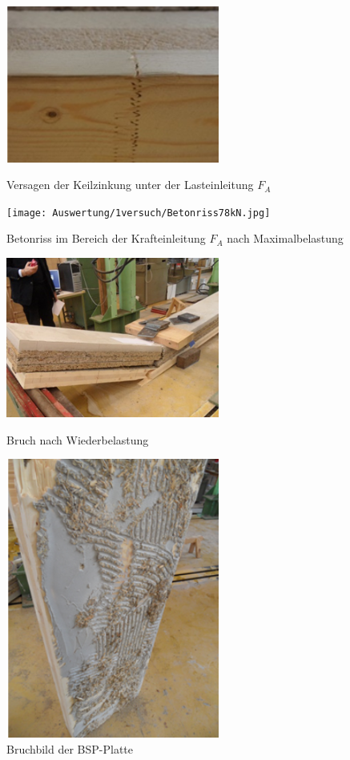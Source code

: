\begin{figure}[h!]
\begin{minipage}[hbt]{7cm}
	\includegraphics[width=7cm]{Auswertung/1versuch/keilzinkung.png}
	\caption{Versagen der Keilzinkung unter der Lasteinleitung $F_{A}$ }
	\label{keilzinkung}
\end{minipage}
\hfill
\begin{minipage}[hbt]{7cm}
	\texttt{[image: Auswertung/1versuch/Betonriss78kN.jpg]}
	\caption{Betonriss im Bereich der Krafteinleitung $F_{A}$ nach Maximalbelastung }
	\label{1bruch}
\end{minipage}
\end{figure}
 


\begin{figure}[h!]
\begin{minipage}[hbt]{7cm}
	\includegraphics[width=7cm]{Auswertung/1versuch/bruch_1versuch.png}
	\caption{Bruch nach Wiederbelastung }
	\label{1bruch}
\end{minipage}
\hfill
\begin{minipage}[hbt]{7cm}
	\includegraphics[width=7cm]{Auswertung/1versuch/bruchbild.png}
\caption{Bruchbild der BSP-Platte }
	\label{bruchbild}
\end{minipage}
\end{figure}

